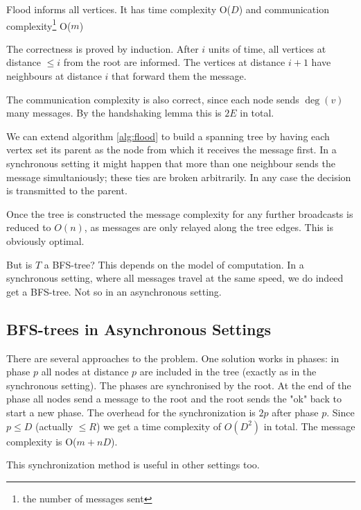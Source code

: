 \begin{thm} Flood informs all vertices. It has time complexity O($D$) and communication complexity\footnote{the number of messages sent} O($m$)
\end{thm}

\begin{pr} The correctness is proved by induction. After $i$ units of time, all vertices at distance $\leq i$ from the root are informed. The vertices at distance $i+1$ have neighbours at distance $i$ that forward them the message.

The communication complexity is also correct, since each node sends $\deg(v)$ many messages. By the handshaking lemma this is $2E$ in total.
\end{pr}

We can extend algorithm \ref{alg:flood} to build a spanning tree by having each vertex set its parent as the node from which it receives the message first. In a synchronous setting it might happen that more than one neighbour sends the message simultaniously; these ties are broken arbitrarily. In any case the decision is transmitted to the parent.

Once the tree is constructed the message complexity for any further broadcasts is reduced to $O(n)$, as messages are only relayed along the tree edges. This is obviously optimal.

But is $T$ a BFS-tree? This depends on the model of computation. In a synchronous setting, where all messages travel at the same speed, we do indeed get a BFS-tree. Not so in an asynchronous setting.

\subsection{BFS-trees in Asynchronous Settings}

There are several approaches to the problem. One solution works in phases: in phase $p$ all nodes at distance $p$ are included in the tree (exactly as in the synchronous setting). The phases are synchronised by the root. At the end of the phase all nodes send a message to the root and the root sends the "ok" back to start a new phase. The overhead for the synchronization is $2p$ after phase $p$. Since $p\leq D$ (actually $\leq R$) we get a time complexity of $O(D^2)$ in total. The message complexity is O($m+nD$).

This synchronization method is useful in other settings too.